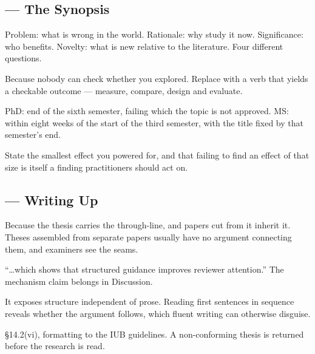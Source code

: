 \subsection*{ --- The Synopsis}
\begin{tightnum}
  \item Problem: what is wrong in the world. Rationale: why study it now.
    Significance: who benefits. Novelty: what is new relative to the
    literature. Four different questions.
  \item Because nobody can check whether you explored. Replace with a verb that
    yields a checkable outcome --- measure, compare, design and evaluate.
  \item PhD: end of the sixth semester, failing which the topic is not approved.
    MS: within eight weeks of the start of the third semester, with the title
    fixed by that semester's end.
  \item State the smallest effect you powered for, and that failing to find an
    effect of that size is itself a finding practitioners should act on.
\end{tightnum}

\subsection*{ --- Writing Up}
\begin{tightnum}
  \item Because the thesis carries the through-line, and papers cut from it
    inherit it. Theses assembled from separate papers usually have no argument
    connecting them, and examiners see the seams.
  \item ``\ldots which shows that structured guidance improves reviewer
    attention.'' The mechanism claim belongs in Discussion.
  \item It exposes structure independent of prose. Reading first sentences in
    sequence reveals whether the argument follows, which fluent writing can
    otherwise disguise.
  \item \S14.2(vi), formatting to the IUB guidelines. A non-conforming thesis
    is returned before the research is read.
\end{tightnum}

